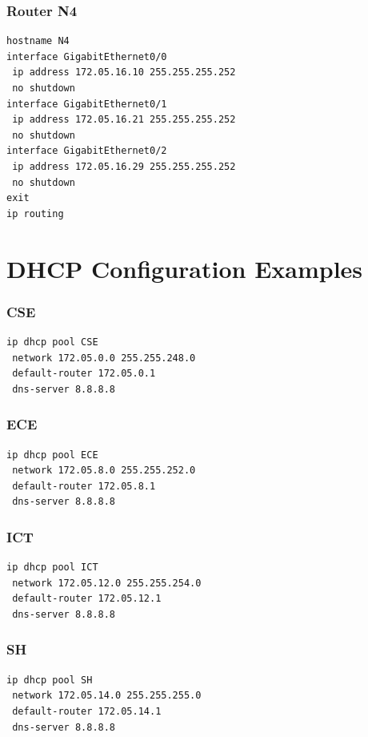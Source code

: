 \documentclass[12pt]{report}
\begin{document}
\subsection{Router N4}
\begin{lstlisting}[basicstyle=\ttfamily\small, frame=single]
hostname N4
interface GigabitEthernet0/0
 ip address 172.05.16.10 255.255.255.252
 no shutdown
interface GigabitEthernet0/1
 ip address 172.05.16.21 255.255.255.252
 no shutdown
interface GigabitEthernet0/2
 ip address 172.05.16.29 255.255.255.252
 no shutdown
exit
ip routing
\end{lstlisting}
\newpage

\chapter{DHCP Configuration Examples}

\subsection{CSE}
\begin{lstlisting}[basicstyle=\ttfamily\small, frame=single]
ip dhcp pool CSE
 network 172.05.0.0 255.255.248.0
 default-router 172.05.0.1
 dns-server 8.8.8.8
\end{lstlisting}

\subsection{ECE}
\begin{lstlisting}[basicstyle=\ttfamily\small, frame=single]
ip dhcp pool ECE
 network 172.05.8.0 255.255.252.0
 default-router 172.05.8.1
 dns-server 8.8.8.8
\end{lstlisting}

\subsection{ICT}
\begin{lstlisting}[basicstyle=\ttfamily\small, frame=single]
ip dhcp pool ICT
 network 172.05.12.0 255.255.254.0
 default-router 172.05.12.1
 dns-server 8.8.8.8
\end{lstlisting}

\subsection{SH}
\begin{lstlisting}[basicstyle=\ttfamily\small, frame=single]
ip dhcp pool SH
 network 172.05.14.0 255.255.255.0
 default-router 172.05.14.1
 dns-server 8.8.8.8
\end{lstlisting}
\end{document}
